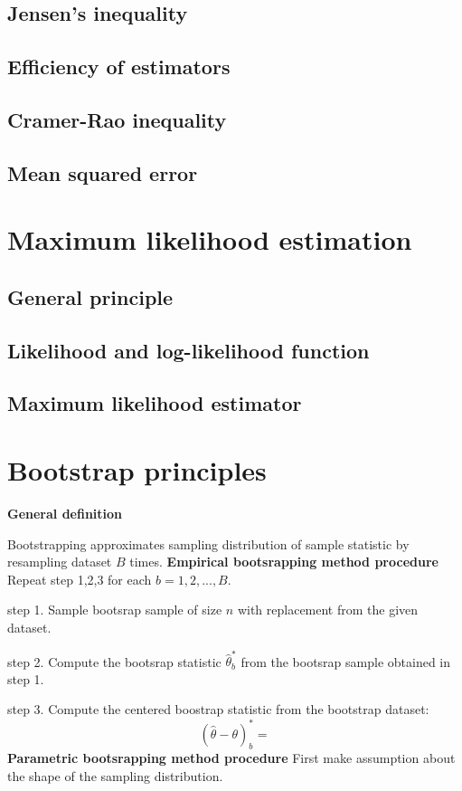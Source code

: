 \documentclass[a4paper]{article}
\begin{document}
\subsection{Jensen's inequality}
\subsection{Efficiency of estimators}
\subsection{Cramer-Rao inequality}
\subsection{Mean squared error}
\newpage
\section{Maximum likelihood estimation}
\subsection{General principle}
\subsection{Likelihood and log-likelihood function}
\subsection{Maximum likelihood estimator}
\newpage
\section{Bootstrap principles}
\begin{mdframed}[style=Summary]
    \textbf{General definition}
    
        Bootstrapping approximates sampling distribution of sample statistic by resampling dataset $B$ times.
    \newline
    \textbf{Empirical bootsrapping method procedure}
    \newline
    Repeat step 1,2,3 for each $b=1,2,...,B$. 

    step 1. Sample bootsrap sample of size $n$ with replacement from the given dataset.

    step 2. Compute the bootsrap statistic $\hat{\theta}^{*}_b$ from the bootsrap sample obtained in step 1.

    step 3. Compute the centered boostrap statistic from the bootstrap dataset:
    $$(\hat{\theta}-\theta)^{*}_b = $$
    \newline
    \textbf{Parametric bootsrapping method procedure}
    First make assumption about the shape of the sampling distribution.


\end{mdframed}
\end{document}
